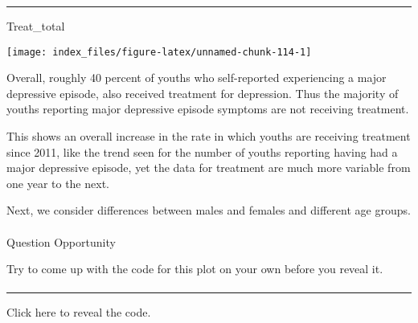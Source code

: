\documentclass[
]{article}
\newenvironment{Shaded}{\begin{snugshade}}{\end{snugshade}}
\newcommand{\NormalTok}[1]{#1}
\begin{document}
\begin{center}\rule{0.5\linewidth}{0.5pt}\end{center}

\begin{Shaded}
\begin{Highlighting}[]
\NormalTok{Treat_total}
\end{Highlighting}
\end{Shaded}

\begin{center}\texttt{[image: index\_files/figure-latex/unnamed-chunk-114-1]} \end{center}

Overall, roughly 40 percent of youths who self-reported experiencing a
major depressive episode, also received treatment for depression. Thus
the majority of youths reporting major depressive episode symptoms are
not receiving treatment.

This shows an overall increase in the rate in which youths are receiving
treatment since 2011, like the trend seen for the number of youths
reporting having had a major depressive episode, yet the data for
treatment are much more variable from one year to the next.

Next, we consider differences between males and females and different
age groups.

\hypertarget{section-32}{%
\paragraph{}\label{section-32}}

Question Opportunity

Try to come up with the code for this plot on your own before you reveal
it.

\hypertarget{section-33}{%
\paragraph{}\label{section-33}}

\begin{center}\rule{0.5\linewidth}{0.5pt}\end{center}

Click here to reveal the code.
\end{document}
